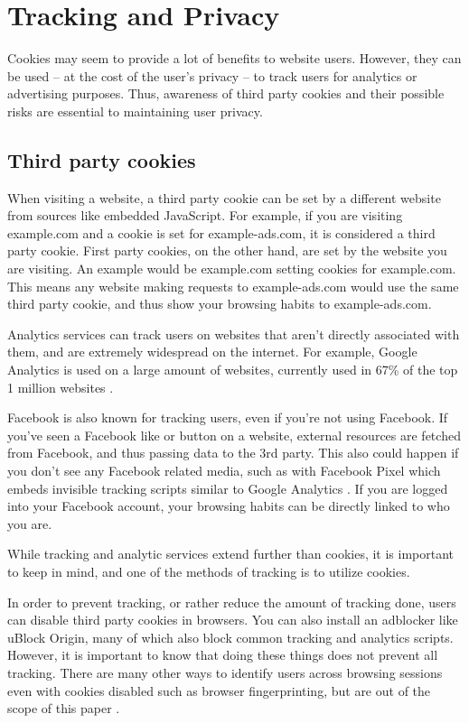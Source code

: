 \documentclass[conference,12pt]{IEEEtran}
\begin{document}
\section{Tracking and Privacy}

Cookies may seem to provide a lot of benefits to website users.  However, they
can be used -- at the cost of the user’s privacy -- to track users for analytics
or advertising purposes. Thus, awareness of third party cookies and their
possible risks are essential to maintaining user privacy. 

\subsection{Third party cookies}

When visiting a website, a third party cookie can be set by a different website
from sources like embedded JavaScript. For example, if you are visiting
example.com and a cookie is set for example-ads.com, it is considered a third
party cookie.  First party cookies, on the other hand, are set by the website
you are visiting.  An example would be example.com setting cookies for
example.com.  This means any website making requests to example-ads.com would
use the same third party cookie, and thus show your browsing habits to
example-ads.com.

Analytics services can track users on websites that aren’t directly associated
with them, and are extremely widespread on the internet.  For example, Google
Analytics is used on a large amount of websites, currently used in 67\% of the
top 1 million websites \cite{b12}.

Facebook is also known for tracking users, even if you’re not using Facebook.
If you’ve seen a Facebook like or button on a website, external resources are
fetched from Facebook, and thus passing data to the 3rd party.  This also could
happen if you don’t see any Facebook related media, such as with Facebook Pixel
which embeds invisible tracking scripts similar to Google Analytics \cite{b13}.
If you are logged into your Facebook account, your browsing habits can be
directly linked to who you are.

While tracking and analytic services extend further than cookies, it is
important to keep in mind, and one of the methods of tracking is to utilize
cookies.

In order to prevent tracking, or rather reduce the amount of tracking done,
users can disable third party cookies in browsers.  You can also install an
adblocker like uBlock Origin, many of which also block common tracking and
analytics scripts.  However, it is important to know that doing these things
does not prevent all tracking.  There are many other ways to identify users
across browsing sessions even with cookies disabled such as browser
fingerprinting, but are out of the scope of this paper \cite{b14}.
\end{document}
